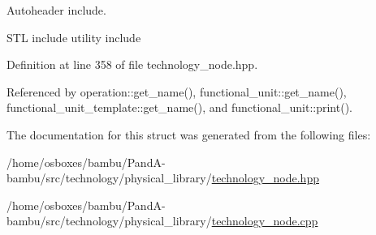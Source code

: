 Autoheader include.

S\+TL include utility include 

Definition at line 358 of file technology\+\_\+node.\+hpp.



Referenced by operation\+::get\+\_\+name(), functional\+\_\+unit\+::get\+\_\+name(), functional\+\_\+unit\+\_\+template\+::get\+\_\+name(), and functional\+\_\+unit\+::print().



The documentation for this struct was generated from the following files\+:\begin{DoxyCompactItemize}
\item 
/home/osboxes/bambu/\+Pand\+A-\/bambu/src/technology/physical\+\_\+library/\hyperlink{technology__node_8hpp}{technology\+\_\+node.\+hpp}\item 
/home/osboxes/bambu/\+Pand\+A-\/bambu/src/technology/physical\+\_\+library/\hyperlink{technology__node_8cpp}{technology\+\_\+node.\+cpp}\end{DoxyCompactItemize}
